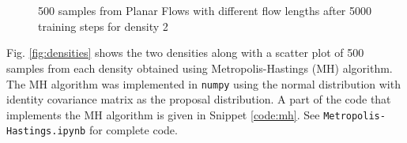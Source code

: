 \documentclass[]{article}
\begin{document}
\begin{figure}
	\centering
	\\
	\\
	\caption{500 samples from Planar Flows with different flow lengths after 5000 training steps for density 2}
	\label{fig:density2}
\end{figure}

Fig. \ref{fig:densities} shows the two densities along with a scatter plot of 500 samples from each density obtained using Metropolis-Hastings (MH) algorithm. The MH algorithm was implemented in \texttt{numpy} using the normal distribution with identity covariance matrix as the proposal distribution. A part of the code that implements the MH algorithm is given in Snippet \ref{code:mh}. See \texttt{Metropolis-Hastings.ipynb} for complete code.
\end{document}
